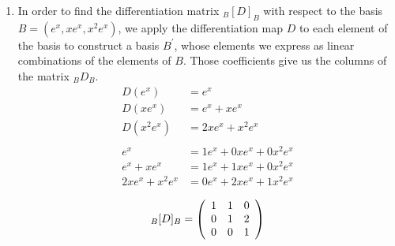 \documentclass{article}
\begin{document}
\begin{enumerate}
\begin{enumerate}
\begin{proof}
\begin{description}
                        \item[Addition.]
                            \begin{align*}
                                T(f(t) + g(t)) &= t (f(t) + g(t)) + t^2 (f^\prime (t) + g^\prime (t)) \\
                                               &= t f(t) + t g(t) + t^2 f^\prime (t) + t^2 g^\prime (t) \\
                                               &= t f(t) + t^2 f^\prime (t) + t g(t) + t^2 g^\prime (t) \\
                                               &= T(f(t)) + T(g(t))
                            \end{align*}
                            Addition is preserved.
                    \end{description}
                \end{proof}
        \end{enumerate}

    \item In order to find the differentiation matrix ${}_B [D]_B$ with respect
        to the basis $B = (e^x, xe^x, x^2 e^x)$, we apply the differentiation
        map $D$ to each element of the basis to construct a basis $B^\prime$,
        whose elements we express as linear combinations of the elements of
        $B$. Those coefficients give us the columns of the matrix ${}_B D_B$.
        \begin{align*}
            D(e^x) &= e^x \\
            D(x e^x) &= e^x + x e^x \\
            D(x^2 e^x) &= 2x e^x + x^2 e^x \\
            \\
            e^x &= 1 e^x + 0 x e^x + 0 x^2 e^x \\
            e^x + x e^x &= 1 e^x + 1 xe^x + 0 x^2 e^x \\
            2x e^x + x^2 e^x &= 0 e^x + 2 x e^x + 1 x^2 e^x
        \end{align*}

        \begin{equation*}
            {}_B [D]_B =
            \left(
                \begin{array}{c c c}
                    1 & 1 & 0 \\
                    0 & 1 & 2 \\
                    0 & 0 & 1
                \end{array}
            \right)
        \end{equation*}

\end{enumerate}
\end{document}
